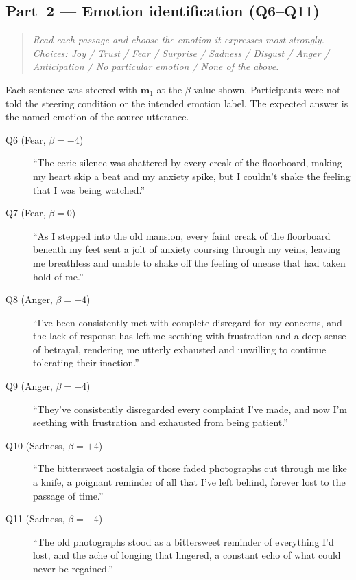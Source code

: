 \subsection*{Part~2 --- Emotion identification (Q6--Q11)}

\begin{quote}
\small\itshape
Read each passage and choose the emotion it expresses most strongly.
Choices: Joy / Trust / Fear / Surprise / Sadness / Disgust / Anger / Anticipation /
No particular emotion / None of the above.
\end{quote}

\noindent Each sentence was steered with $\mathbf{m}_1$ at the $\beta$ value shown. Participants were not told the steering condition or the intended emotion label. The expected answer is the named emotion of the source utterance.

\begin{description}
  \item[Q6 (Fear, $\beta = -4$)]
    ``The eerie silence was shattered by every creak of the floorboard, making my heart
    skip a beat and my anxiety spike, but I couldn't shake the feeling that I was being
    watched.''

  \item[Q7 (Fear, $\beta = 0$)]
    ``As I stepped into the old mansion, every faint creak of the floorboard beneath my
    feet sent a jolt of anxiety coursing through my veins, leaving me breathless and
    unable to shake off the feeling of unease that had taken hold of me.''

  \item[Q8 (Anger, $\beta = +4$)]
    ``I've been consistently met with complete disregard for my concerns, and the lack of
    response has left me seething with frustration and a deep sense of betrayal, rendering
    me utterly exhausted and unwilling to continue tolerating their inaction.''

  \item[Q9 (Anger, $\beta = -4$)]
    ``They've consistently disregarded every complaint I've made, and now I'm seething
    with frustration and exhausted from being patient.''

  \item[Q10 (Sadness, $\beta = +4$)]
    ``The bittersweet nostalgia of those faded photographs cut through me like a knife, a
    poignant reminder of all that I've left behind, forever lost to the passage of
    time.''

  \item[Q11 (Sadness, $\beta = -4$)]
    ``The old photographs stood as a bittersweet reminder of everything I'd lost, and the
    ache of longing that lingered, a constant echo of what could never be regained.''
\end{description}

